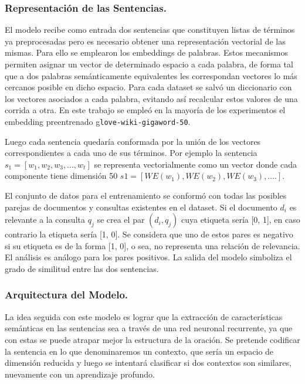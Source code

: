 \documentclass{llncs}
\begin{document}
\subsubsection{Representación de las Sentencias.}

El modelo recibe como entrada dos sentencias que constituyen listas de términos ya preprocesadas pero es necesario obtener una representación vectorial de las mismas. Para ello se emplearon los embeddings de palabras. Estos mecanismos permiten asignar un vector de determinado espacio a cada palabra, de forma tal que a dos palabras semánticamente equivalentes les correspondan vectores lo más cercanos posible en dicho espacio. Para cada dataset se salvó un diccionario con los vectores asociados a cada palabra, evitando así recalcular estos valores de una corrida a otra. En este trabajo se empleó en la mayoría de los experimentos el embedding preentrenado g\texttt{love-wiki-gigaword-50}. 

Luego cada sentencia quedaría conformada por la unión de los vectores correspondientes a cada uno de sus términos. Por ejemplo la sentencia $s_1 = [w_1, w_2, w_3, ..., w_t]$ se representa vectorialmente como un vector donde cada componente tiene dimensión 50 $s1 = [WE(w_1), WE(w_2), WE(w_3), ....]$.

El conjunto de datos para el entrenamiento se conformó con todas las posibles parejas de documentos y consultas existentes en el dataset. Si el documento $d_i$ es relevante a la consulta $q_j$ se crea el par $(d_i, q_j)$ cuya etiqueta sería [0, 1], en caso contrario la etiqueta sería [1, 0]. Se considera que uno de estos pares es negativo si su etiqueta es de la forma [1, 0], o sea, no representa una relación de relevancia. El análisis es análogo para los pares positivos. La salida del modelo simboliza el grado de similitud entre las dos sentencias.

\subsubsection{Arquitectura del Modelo.}
La idea seguida con este modelo es lograr que la extracción de características semánticas en las sentencias sea a través de una red neuronal recurrente, ya que con estas se puede atrapar mejor la estructura de la oración. Se pretende codificar la sentencia en lo que denominaremos un contexto, que sería un espacio de dimensión reducida y luego se intentará clasificar si dos contextos son similares, nuevamente con un aprendizaje profundo.
\end{document}
